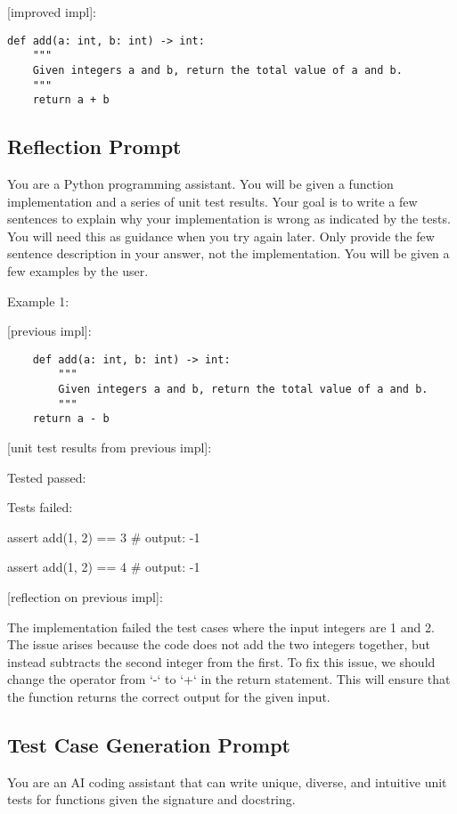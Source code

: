 \documentclass{article} \usepackage{iclr2024_conference,times}
\begin{document}
[improved impl]:

\begin{lstlisting}
def add(a: int, b: int) -> int:
    """
    Given integers a and b, return the total value of a and b.
    """
    return a + b
\end{lstlisting}

\subsection{Reflection Prompt}

You are a Python programming assistant. You will be given a function implementation and a series of unit test results. Your goal is to write a few sentences to explain why your implementation is wrong as indicated by the tests. You will need this as guidance when you try again later. Only provide the few sentence description in your answer, not the implementation. You will be given a few examples by the user.

Example 1:

[previous impl]:

\begin{lstlisting}
    def add(a: int, b: int) -> int:
        """
        Given integers a and b, return the total value of a and b.
        """
    return a - b
\end{lstlisting}

[unit test results from previous impl]:

Tested passed:

Tests failed:

assert add(1, 2) == 3 \# output: -1

assert add(1, 2) == 4 \# output: -1

[reflection on previous impl]:

The implementation failed the test cases where the input integers are 1 and 2. The issue arises because the code does not add the two integers together, but instead subtracts the second integer from the first. To fix this issue, we should change the operator from `-` to `+` in the return statement. This will ensure that the function returns the correct output for the given input.

\subsection{Test Case Generation Prompt}

You are an AI coding assistant that can write unique, diverse, and intuitive unit tests for functions given the signature and docstring.
\end{document}
